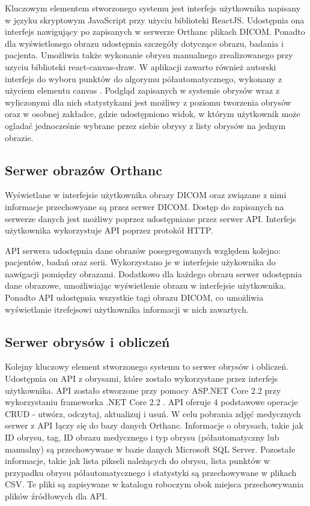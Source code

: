 \documentclass[a4paper,11pt,twoside,openright]{report}
\theoremstyle{definition}
\begin{document}
Kluczowym elementem stworzonego systemu jest interfejs użytkownika napisany w języku skryptowym JavaScript przy użyciu biblioteki ReactJS. Udostępnia ona interfejs nawigujący po zapisanych w serwerze Orthanc plikach DICOM. Ponadto dla wyświetlonego obrazu udostępnia szczegóły dotyczące obrazu, badania i pacjenta. Umożliwia także wykonanie obrysu manualnego zrealizowanego przy uzyciu biblioteki react-canvas-draw. W aplikacji zawarto również autorski interfejs do wyboru punktów do algorymu półautomatycznego, wykonany z użyciem elementu canvas \cite{Canvas}. Podgląd zapisanych w systemie obrysów wraz z wyliczonymi dla nich statystykami jest możliwy z poziomu tworzenia obrysów oraz w osobnej zakładce, gdzie udostępniono widok, w którym użytkownik może ogladać jednocześnie wybrane przez siebie obrysy z listy obrysów na jednym obrazie.

\subsection {Serwer obrazów Orthanc}

Wyświetlane w interfejsie użytkownika obrazy DICOM oraz związane z nimi informacje przechowyane są przez serwer DICOM. Dostęp do zapisanych na serwerze danych jest możliwy poprzez udostępniane przez serwer API. Interfejs użytkownika wykorzystuje API poprzez protokół HTTP.

API serwera udostępnia dane obrazów posegregowanych względem kolejno: pacjentów, badań oraz serii. Wykorzystano je w interfejsie użykownika do nawigacji pomiędzy obrazami. Dodatkowo dla każdego obrazu serwer udostępnia dane obrazowe, umożliwiając wyświetlenie obrazu w interfejsie użytkownika. Ponadto API udostępnia wszystkie tagi obrazu DICOM, co umożliwia wyświetlanie itrefejsowi użytkownika informacji w nich zawartych.

\subsection {Serwer obrysów i obliczeń}
Kolejny kluczowy element stworzonego systemu to serwer obrysów i obliczeń. Udostępnia on API z obrysami, które zostało wykorzystane przez interfejs użytkownika. API zostało stworzone przy pomocy ASP.NET Core 2.2 \cite{ASPNET} przy wykorzystaniu frameworka .NET Core 2.2 \cite{Charakterystyka dotnet}. API oferuje 4 podstawowe operacje CRUD - utwórz, odczytaj, aktualizuj i usuń. W celu pobrania zdjęć medycznych serwer z API łączy się do bazy danych Orthanc. Informacje o obrysach, takie jak ID obrysu, tag, ID obrazu medycznego i typ obrysu (półautomatyczny lub manualny) są przechowywane w bazie danych Microsoft SQL Server. Pozostałe informacje, takie jak lista pikseli należących do obrysu, lista punktów w przypadku obrysu półautomatycznego i statystyki są przechowywane w plikach CSV. Te pliki są zapisywane w katalogu roboczym obok miejsca przechowywania plików źródłowych dla API.
\end{document}
